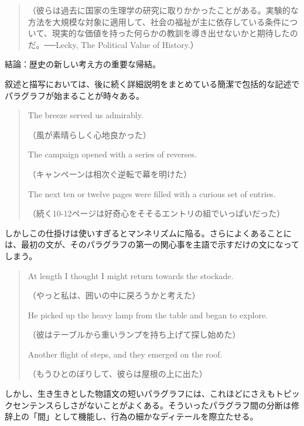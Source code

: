 \begin{enumerate}
\begin{quote}
（彼らは過去に国家の生理学の研究に取りかかったことがある。実験的な方法を大規模な対象に適用して、社会の福祉が主に依存している条件について、現実的な価値を持った何らかの教訓を導き出せないかと期待したのだ。──Lecky,
The Political Value of History.）
    \end{quote}
    結論：歴史の新しい考え方の重要な帰結。
\end{enumerate}
叙述と描写においては、後に続く詳細説明をまとめている簡潔で包括的な記述でパラグラフが始まることが時々ある。
\begin{quote}
The breeze served us admirably.

（風が素晴らしく心地良かった）

The campaign opened with a series of reverses.

（キャンペーンは相次ぐ逆転で幕を明けた）

The next ten or twelve pages were filled with a curious set of
entries.

（続く10-12ページは好奇心をそそるエントリの組でいっぱいだった）
\end{quote}
しかしこの仕掛けは使いすぎるとマンネリズムに陥る。さらによくあることには、最初の文が、そのパラグラフの第一の関心事を主語で示すだけの文になってしまう。
\begin{quote}
At length I thought I might return towards the stockade.

（やっと私は、囲いの中に戻ろうかと考えた）

He picked up the heavy lamp from the table and began to explore.

（彼はテーブルから重いランプを持ち上げて探し始めた）

Another flight of steps, and they emerged on the roof.

（もうひとのぼりして、彼らは屋根の上に出た）
\end{quote}
しかし、生き生きとした物語文の短いパラグラフには、これほどにさえもトピックセンテンスらしさがないことがよくある。そういったパラグラフ間の分断は修辞上の「間」として機能し、行為の細かなディテールを際立たせる。
